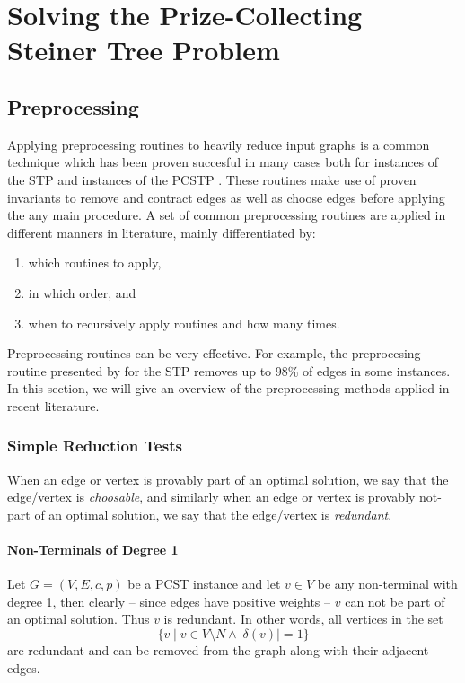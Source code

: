 \chapter{Solving the Prize-Collecting Steiner Tree Problem}
\label{chap:solving}
\section{Preprocessing}
Applying preprocessing routines to heavily reduce input graphs is a common technique which has been proven succesful in many cases both for instances of the STP
\citep{koch1998solving}
and instances of the PCSTP
\citep{ljubic2005solving, gamrath2017scip}. %
These routines make use of proven invariants to remove and contract edges as well as choose edges before applying the any main procedure.
A set of common preprocessing routines are applied in different manners in literature, mainly differentiated by:
\begin{enumerate}[label=\alph*)]
\item which routines to apply,
\item in which order, and
\item when to recursively apply routines and how many times.
\end{enumerate}
Preprocessing routines can be very effective. For example, the preprocesing routine presented by \cite{koch1998solving} for the STP removes
up to 98\% of edges in some instances. In this section, we will give an overview of the preprocessing methods applied in
 recent literature.
\subsection{Simple Reduction Tests}
When an edge or vertex is provably part of an optimal solution, we say that the edge/vertex is \textit{choosable}, and similarly when
 an edge or vertex is provably not-part of an optimal solution, we say that the edge/vertex is \textit{redundant}.

\subsubsection{Non-Terminals of Degree 1}
\label{sec:red:test:deg1}
Let $G = (V, E, c, p)$ be a PCST instance and let $v \in V$ be any non-terminal with degree 1, then
 clearly -- since edges have positive weights -- $v$ can not be part of an optimal solution. Thus $v$ is redundant. In other words,
 all vertices in the set
 $$\{v \mid v \in V \setminus N \wedge |\delta(v)| = 1\}$$
 are redundant and can be removed from the graph along with their adjacent edges.

